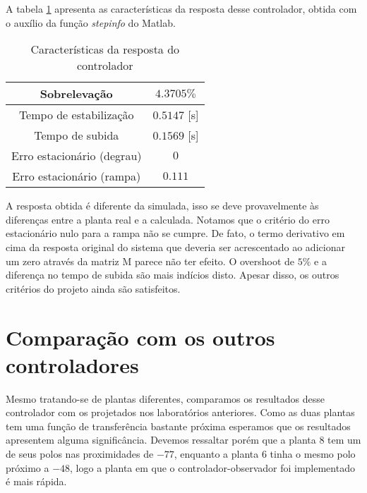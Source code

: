 \documentclass{article}
\begin{document}
A tabela \ref{tab:stepinfoSIS} apresenta as características da resposta desse controlador, obtida com o auxílio da função \textit{stepinfo} do Matlab.
\begin{table}[H]
	\centering
	\caption{Características da resposta do controlador}
	\label{tab:stepinfoSIS}
	\begin{tabular}{|c|c|}
		\hline Sobrelevação 				& $4.3705\%$ \\ 
		\hline Tempo de estabilização 		& $0.5147$ [s]\\ 
		\hline Tempo de subida				& $0.1569$ [s]\\ 
		\hline Erro estacionário (degrau) 	& $0$\\ 
		\hline Erro estacionário (rampa) 	& $0.111$\\ 
		\hline 
	\end{tabular} 
\end{table}
A resposta obtida é diferente da simulada, isso se deve provavelmente às diferenças entre a planta real e a calculada. Notamos que o critério do erro estacionário nulo para a rampa não se cumpre. De fato, o termo derivativo em cima da resposta original do sistema que deveria ser acrescentado ao adicionar um zero através da matriz M parece não ter efeito. O overshoot de $5\%$ e a diferença no tempo de subida são mais indícios disto.
Apesar disso, os outros critérios do projeto ainda são satisfeitos.

\section{Comparação com os outros controladores}

Mesmo tratando-se de plantas diferentes, comparamos os resultados desse controlador com os projetados nos laboratórios anteriores. Como as duas plantas tem uma função de transferência bastante próxima esperamos que os resultados apresentem alguma significância. Devemos ressaltar porém que a planta $8$ tem um de seus polos nas proximidades de $-77$, enquanto a planta $6$ tinha o mesmo polo próximo a $-48$, logo a planta em que o controlador-observador foi implementado é mais rápida.
\end{document}
